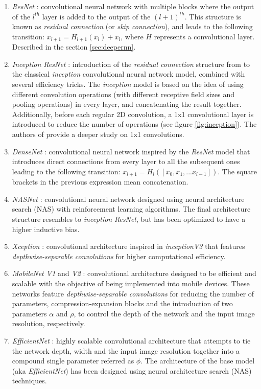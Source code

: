  \begin{enumerate}
	 \item \textit{ResNet} \autocite{he2016}: convolutional neural network with multiple blocks where the output of the $l^{th}$ layer is added to the output of the $(l+1)^{th}$. This structure is known as \textit{residual connection} (or \textit{skip connection}), and leads to the following transition: $x_{l+1} = H_{l+1}(x_{l}) + x_l$, where $H$ represents a convolutional layer. Described in the section \ref{sec:deepernn}.
		\item \textit{Inception ResNet} \autocite{szegedy2017}: introduction of the \textit{residual connection} structure from \autocite{he2016} to the classical \textit{inception} convolutional neural network model, combined with several efficiency tricks. The \textit{inception} model is based on the idea of using different convolution operations (with different receptive field sizes and pooling operations) in every layer, and concatenating the result together. Additionally, before each regular 2D convolution, a 1x1 convolutional layer is introduced to reduce the number of operations (see figure \ref{fig:inception}). The authors of \autocite{lin2014} provide a deeper study on 1x1 convolutions.
	 \item \textit{DenseNet} \autocite{huang2017}: convolutional neural network inspired by the \textit{ResNet} model \autocite{he2016} that introduces direct connections from every layer to all the subsequent ones leading to the following transition: $x_{l+1} = H_l([x_0, x_1, ... x_{l-1}])$. The square brackets in the previous expression mean concatenation.
	 \item \textit{NASNet} \autocite{pham2018}: convolutional neural network designed using neural architecture search (NAS) with reinforcement learning algorithms. The final architecture structure resembles to \textit{inception} \textit{ResNet}, but has been optimized to have a higher inductive bias.
	 \item \textit{Xception} \autocite{chollet2017}: convolutional architecture inspired in \textit{inceptionV3}  \autocite{szegedy2016} that features \textit{depthwise-separable convolutions} for higher computational efficiency.
	 \item \textit{MobileNet V1} and \textit{V2} \autocite{howard2017, sandler2018}: convolutional architecture designed to be efficient and scalable with the objective of being implemented into mobile devices. These networks feature \textit{depthwise-separable convolutions} for reducing the number of parameters, compression-expansion blocks and the introduction of two parameters $\alpha$ and $\rho$, to control the depth of the network and the input image resolution, respectively.
	 \item \textit{EfficientNet} \autocite{tan2019}: highly scalable convolutional architecture that attempts to tie the network depth, width and the input image resolution  together into a compound single parameter referred as $\phi$. The architecture of the base model (aka \textit{EfficientNet}) has been designed using neural architecture search (NAS) techniques.
 \end{enumerate}
 
